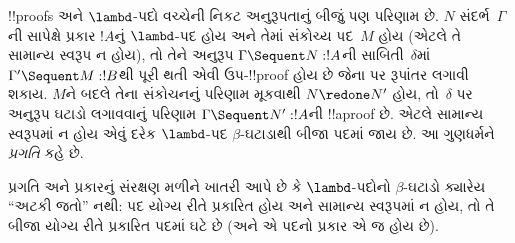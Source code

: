 \documentclass[../../../include/open-logic-section]{subfiles}
\begin{document}
!!{proof}s અને $\lambd$-પદો વચ્ચેની નિકટ અનુરૂપતાનું
બીજું પણ પરિણામ છે.
$N$ સંદર્ભ~$\Gamma$ની સાપેક્ષે પ્રકાર $!A$નું
$\lambd$-પદ હોય અને તેમાં સંકોચ્ય પદ~$M$ હોય
(એટલે તે સામાન્ય સ્વરૂપ ન હોય), તો તેને અનુરૂપ
$\Gamma \Sequent N : !A$ની  સાબિતી~$\delta$માં
$\Gamma' \Sequent M: !B$થી પૂરી થતી એવી
ઉપ-!!{proof} હોય છે જેના પર રૂપાંતર લગાવી શકાય.
$M$ને બદલે તેના સંકોચનનું પરિણામ મૂકવાથી
$N \redone N'$ હોય, તો~$\delta$ પર
અનુરૂપ ઘટાડો લગાવવાનું પરિણામ
$\Gamma \Sequent N' : !A$ની !!a{proof} છે.
એટલે સામાન્ય સ્વરૂપમાં ન હોય એવું દરેક $\lambd$-પદ
$\beta$-ઘટાડાથી બીજા પદમાં જાય છે.
આ ગુણધર્મને \emph{પ્રગતિ} કહે છે.

પ્રગતિ અને પ્રકારનું સંરક્ષણ મળીને ખાતરી આપે છે
કે $\lambd$-પદોનો $\beta$-ઘટાડો ક્યારેય ``અટકી જતો'' નથી:
પદ યોગ્ય રીતે પ્રકારિત હોય અને સામાન્ય સ્વરૂપમાં ન હોય,
તો તે બીજા યોગ્ય રીતે પ્રકારિત પદમાં ઘટે છે
(અને એ પદનો પ્રકાર એ જ હોય છે).
\end{document}

